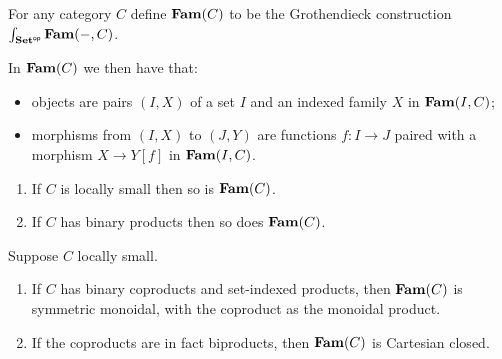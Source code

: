 \begin{definition}
For any category $C$ define $\mathbf{Fam}(C)$ to be the Grothendieck construction
$\int_{\mathbf{Set}^{\mathsf{op}}}\mathbf{Fam}(-,C)$.
\end{definition}

In $\mathbf{Fam}(C)$ we then have that:
\begin{itemize}
\item objects are pairs $(I, X)$ of a set $I$ and an indexed family $X$ in $\mathbf{Fam}(I,C)$;
\item morphisms from $(I, X)$ to $(J, Y)$ are functions $f: I \to J$ paired with a morphism $X \to Y[f]$ in
$\mathbf{Fam}(I,C)$.
\end{itemize}

\begin{proposition}
\item
\begin{enumerate}
\item If $C$ is locally small then so is $\mathbf{Fam}(C)$.
\item If $C$ has binary products then so does $\mathbf{Fam}(C)$.
\end{enumerate}
\end{proposition}

\begin{proposition}
Suppose $C$ locally small.
\begin{enumerate}
\item If $C$ has binary coproducts and set-indexed products, then $\mathbf{Fam}(C)$ is symmetric monoidal, with the
coproduct as the monoidal product.
\item If the coproducts are in fact biproducts, then $\mathbf{Fam}(C)$ is Cartesian closed.
\end{enumerate}
\end{proposition}

